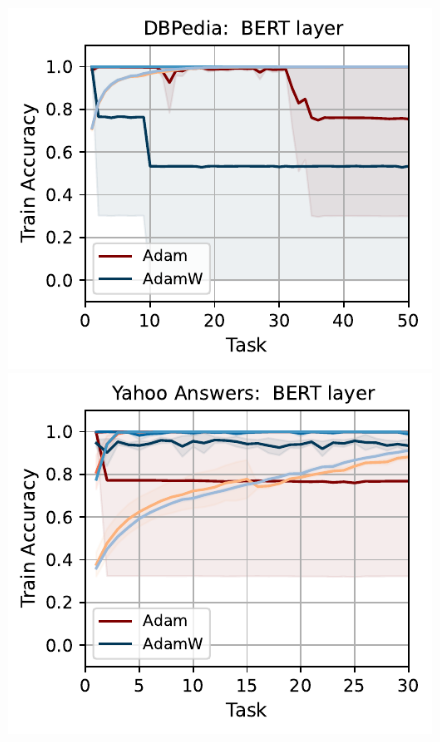 \begin{figure}[t]
{        \includegraphics[width=\textwidth]{figs/Accuracy/nlp/bert_layer/dbpedia_40.pdf}
        \includegraphics[width=\textwidth]{figs/Accuracy/nlp/bert_layer/yahoo_answers_40.pdf}
}
\end{figure}
